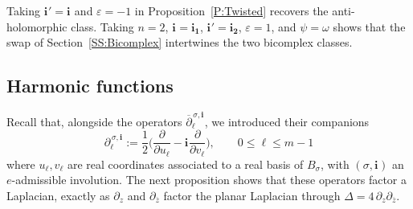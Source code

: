 \documentclass[12pt]{amsart}
\theoremstyle{plain}
\theoremstyle{definition}
\numberwithin{equation}{section}
\newcommand{\im}[1]{\mathbf{ i_{#1}}}
\begin{document}
Taking $\im{}' = \im{}$ and $\varepsilon = -1$ in Proposition~\ref{P:Twisted} recovers the anti-holomorphic class. Taking $n = 2$, $\im{} = \im{1}$, $\im{}' = \im{2}$, $\varepsilon = 1$, and $\psi = \omega$ shows that the swap of Section~\ref{SS:Bicomplex} intertwines the two bicomplex classes. %

\subsection{Harmonic functions}

Recall that, alongside the operators $\overline{\partial}_\ell^{\, \sigma , \im{}}$, we introduced their companions
    \begin{equation}\label{Eq:UnbarredWirtinger}
    \partial_\ell^{\, \sigma , \im{}} := \frac{1}{2} \Big( \frac{\partial}{\partial u_\ell} - \im{} \frac{\partial}{\partial v_\ell} \Big) , \qquad 0 \leq \ell \leq m - 1 
    \end{equation}
where $u_{\ell}, v_{\ell}$ are real coordinates associated to a real basis of $B_{\sigma}$, with $(\sigma, \im{})$ an $e$-admissible involution. The next proposition shows that these operators factor a Laplacian, exactly as $\partial_z$ and $\partial_{\overline z}$ factor the planar Laplacian through $\Delta = 4\, \partial_z \partial_{\overline z}$.
\end{document}
